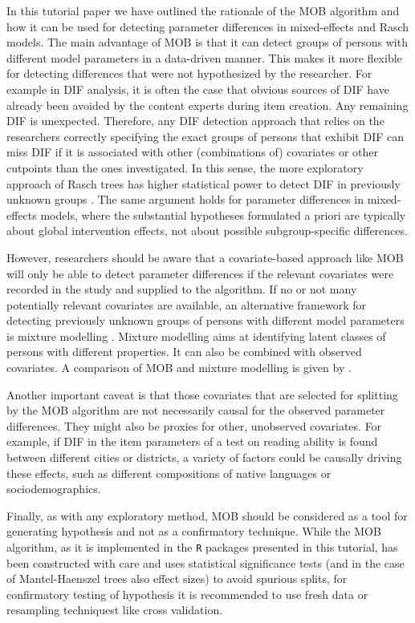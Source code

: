 \documentclass[doc,floatsintext,natbib]{apa7}
\begin{document}
In this tutorial paper we have outlined the rationale of the MOB algorithm and how it can be used for detecting parameter differences in mixed-effects and Rasch models. The main advantage of MOB is that it can detect groups of persons with different model parameters in a data-driven manner. This makes it more flexible for detecting differences that were not hypothesized by the researcher. For example in DIF analysis, it is often the case that obvious sources of DIF have already been avoided by the content experts during item creation. Any remaining DIF is unexpected. Therefore, any DIF detection approach that relies on the researchers correctly specifying the exact groups of persons that exhibit DIF can miss DIF if it is associated with other (combinations of) covariates or other cutpoints than the ones investigated. In this sense, the more exploratory approach of Rasch trees has higher statistical power to detect DIF in previously unknown groups \citep{StrKopZei:2015:P}. The same argument holds for parameter differences in mixed-effects models, where the substantial hypotheses formulated a priori are typically about global intervention effects, not about possible subgroup-specific differences. 


However, researchers should be aware that a covariate-based approach like MOB will only be able to detect parameter differences if the relevant covariates were recorded in the study and supplied to the algorithm. If no or not many potentially relevant covariates are available, an alternative framework for detecting previously unknown groups of persons with different model parameters is mixture modelling \citep[see, e.g.,][in the context of Rasch modelling]{AyalySant17,FriStrZei:2015:EaPM}. Mixture modelling aims at identifying latent classes of persons with different properties. It can also be combined with observed covariates. A comparison of MOB and mixture modelling is given by \citet{FriStrZei:2014}.

Another important caveat is that those covariates that are selected for splitting by the MOB algorithm are not necessarily causal for the observed parameter differences. They might also be proxies for other, unobserved covariates. For example, if DIF in the item parameters of a test on reading ability is found between different cities or districts, a variety of factors could be causally driving these effects, such as different compositions of native languages or sociodemographics. 

Finally, as with any exploratory method, MOB should be considered as a tool for generating hypothesis and not as a confirmatory technique. While the MOB algorithm, as it is implemented in the \texttt{R} packages presented in this tutorial, has been constructed with care and uses statistical significance tests (and in the case of Mantel-Haenszel trees also effect sizes) to avoid spurious splits, for confirmatory testing of hypothesis it is recommended to use fresh data or resampling techniquest like cross validation.  
\end{document}
